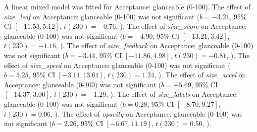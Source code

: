 A linear mixed model was fitted for Acceptance: glanceable (0-100).
The effect of \textit{size\_leaf} on Acceptance: glanceable (0-100) was not significant ($b = -3.21$, 95\% CI $[-11.53, 5.12]$, $t(230) = -0.76$, ).
The effect of \textit{size\_score} on Acceptance: glanceable (0-100) was not significant ($b = -4.90$, 95\% CI $[-13.21, 3.42]$, $t(230) = -1.16$, ).
The effect of \textit{size\_feedback} on Acceptance: glanceable (0-100) was not significant ($b = -3.44$, 95\% CI $[-11.86, 4.98]$, $t(230) = -0.81$, ).
The effect of \textit{size\_speed} on Acceptance: glanceable (0-100) was not significant ($b = 5.25$, 95\% CI $[-3.11, 13.61]$, $t(230) = 1.24$, ).
The effect of \textit{size\_accel} on Acceptance: glanceable (0-100) was not significant ($b = -5.69$, 95\% CI $[-14.37, 3.00]$, $t(230) = -1.29$, ).
The effect of \textit{size\_labels} on Acceptance: glanceable (0-100) was not significant ($b = 0.28$, 95\% CI $[-8.70, 9.27]$, $t(230) = 0.06$, ).
The effect of \textit{opacity} on Acceptance: glanceable (0-100) was not significant ($b = 2.26$, 95\% CI $[-6.67, 11.19]$, $t(230) = 0.50$, ).
